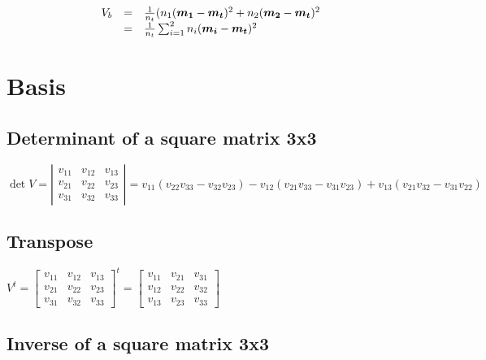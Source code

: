 \documentclass{article}
\begin{document}
$$
\begin{array}{lcl}
V_b & = & \frac{1}{n_t}(n_1 (\mbox{\boldmath$m_1$} - \mbox{\boldmath$m_t$})^2 +
 n_2 (\mbox{\boldmath$m_2$} - \mbox{\boldmath$m_t$})^2 \\
    & = & \frac{1}{n_t} \sum_{i=1}^2 n_i 
 (\mbox{\boldmath$m_i$} - \mbox{\boldmath$m_t$})^2
\end{array}
$$

\section{Basis}

\subsection{Determinant of a square matrix 3x3}

$$
\det{V} =
\left|\begin{array}{ccc}
 v_{11} & v_{12} & v_{13} \\
 v_{21} & v_{22} & v_{23} \\
 v_{31} & v_{32} & v_{33}
\end{array}\right|
=
v_{11}(v_{22}v_{33} - v_{32}v_{23})
- v_{12}(v_{21}v_{33} - v_{31}v_{23})
+ v_{13}(v_{21}v_{32} - v_{31}v_{22})
$$

\subsection{Transpose}

$
V^t =
\left[\begin{array}{ccc}
 v_{11} & v_{12} & v_{13} \\
 v_{21} & v_{22} & v_{23} \\
 v_{31} & v_{32} & v_{33}
\end{array}\right]^t
=
\left[\begin{array}{ccc}
 v_{11} & v_{21} & v_{31} \\
 v_{12} & v_{22} & v_{32} \\
 v_{13} & v_{23} & v_{33}
\end{array}\right]
$

\subsection{Inverse of a square matrix 3x3}
\end{document}
